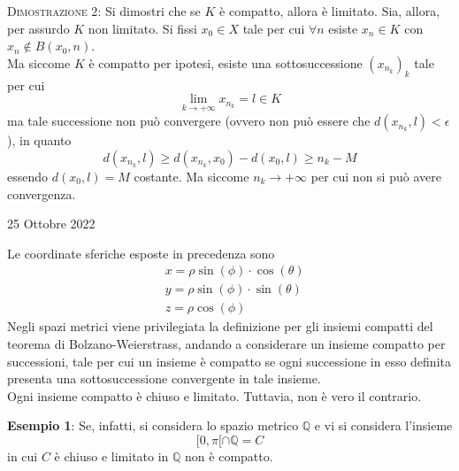 \documentclass[a4paper]{extarticle}
\begin{document}
\vspace{2em}
\noindent
\normalfont \normalsize
\textsc{Dimostrazione 2}: Si dimostri che se $K$ è compatto, allora è limitato. Sia, allora, per assurdo $K$ non limitato. Si fissi $x_0 \in X$ tale per cui $\forall n$ esiste $x_n \in K$ con $x_n \notin B \left(x_0,n\right)$.\\
Ma siccome $K$ è compatto per ipotesi, esiste una sottosuccessione $(x_{n_k})_k$ tale per cui
\[\lim_{k \to +\infty} x_{n_k} = l \in K\]
ma tale successione non può convergere (ovvero non può essere che $d(x_{n_k},l)<\epsilon$), in quanto
\[d(x_{n_k},l) \geq d(x_{n_k},x_0) - d(x_0,l) \geq n_k - M\]
essendo $d(x_0,l)=M$ costante. Ma siccome $n_k \to +\infty$ per cui non si può avere convergenza.

\newpage
\noindent
\begin{center}
    25 Ottobre 2022
\end{center}
Le coordinate sferiche esposte in precedenza sono
\begin{align*}
    &x=\rho \sin(\phi) \cdot \cos(\theta)\\
    &y=\rho \sin(\phi) \cdot \sin(\theta)\\
    &z=\rho \cos(\phi)
\end{align*}
Negli spazi metrici viene privilegiata la definizione per gli insiemi compatti del teorema di Bolzano-Weierstrass, andando a considerare un insieme compatto per successioni, tale per cui un insieme è compatto se ogni successione in esso definita presenta una sottosuccessione convergente in tale insieme.\\
Ogni insieme compatto è chiuso e limitato. Tuttavia, non è vero il contrario. 

\vspace{1em}
\noindent
\textbf{Esempio 1}: Se, infatti, si considera lo spazio metrico $\mathbb{Q}$ e vi si considera l'insieme
\[[0,\pi[ \cap \mathbb{Q} = C\]
in cui $C$ è chiuso e limitato in $\mathbb{Q}$ non è compatto.
\end{document}
